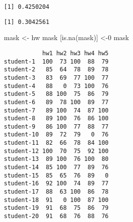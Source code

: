 \documentclass[
  letterpaper,
  DIV=11,
  numbers=noendperiod]{scrartcl}
\newenvironment{Shaded}{\begin{snugshade}}{\end{snugshade}}
\newcommand{\DecValTok}[1]{\textcolor[rgb]{0.68,0.00,0.00}{#1}}
\newcommand{\FunctionTok}[1]{\textcolor[rgb]{0.28,0.35,0.67}{#1}}
\newcommand{\NormalTok}[1]{\textcolor[rgb]{0.00,0.23,0.31}{#1}}
\newcommand{\OtherTok}[1]{\textcolor[rgb]{0.00,0.23,0.31}{#1}}
\newcommand{\SpecialCharTok}[1]{\textcolor[rgb]{0.37,0.37,0.37}{#1}}
\begin{document}
\begin{Shaded}
\end{Shaded}

\begin{verbatim}
[1] 0.4250204
\end{verbatim}

\begin{Shaded}
\end{Shaded}

\begin{verbatim}
[1] 0.3042561
\end{verbatim}

\begin{Shaded}
\begin{Highlighting}[]
\NormalTok{mask }\OtherTok{\textless{}{-}}\NormalTok{ hw}
\NormalTok{mask [}\FunctionTok{is.na}\NormalTok{(mask)] }\OtherTok{\textless{}{-}}\DecValTok{0}
\NormalTok{mask}
\end{Highlighting}
\end{Shaded}

\begin{verbatim}
           hw1 hw2 hw3 hw4 hw5
student-1  100  73 100  88  79
student-2   85  64  78  89  78
student-3   83  69  77 100  77
student-4   88   0  73 100  76
student-5   88 100  75  86  79
student-6   89  78 100  89  77
student-7   89 100  74  87 100
student-8   89 100  76  86 100
student-9   86 100  77  88  77
student-10  89  72  79   0  76
student-11  82  66  78  84 100
student-12 100  70  75  92 100
student-13  89 100  76 100  80
student-14  85 100  77  89  76
student-15  85  65  76  89   0
student-16  92 100  74  89  77
student-17  88  63 100  86  78
student-18  91   0 100  87 100
student-19  91  68  75  86  79
student-20  91  68  76  88  76
\end{verbatim}

\begin{Shaded}
\end{Shaded}
\end{document}
